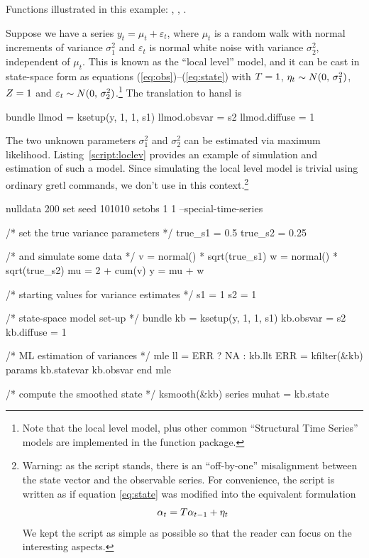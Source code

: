 Functions illustrated in this example: , ,
.

Suppose we have a series $y_t = \mu_t + \varepsilon_t$, where $\mu_t$
is a random walk with normal increments of variance $\sigma^2_1$ and
$\varepsilon_t$ is normal white noise with variance $\sigma^2_2$,
independent of $\mu_t$. This is known as the ``local level'' model,
and it can be cast in state-space form as equations
(\ref{eq:obs})--(\ref{eq:state}) with $T = 1$, $\eta_t \sim
N(0,\, \sigma^2_1)$, $Z = 1$ and $\varepsilon_t \sim N(0,\,
\sigma^2_2)$.\footnote{Note that the local level model, plus other
  common ``Structural Time Series'' models are implemented in the
   function package.} The translation to \textsf{hansl}
is
\begin{code}
bundle llmod = ksetup(y, 1, 1, s1)
llmod.obsvar = s2
llmod.diffuse = 1
\end{code}

The two unknown parameters $\sigma^2_1$ and $\sigma^2_2$ can be
estimated via maximum likelihood.  Listing~\ref{script:loclev} provides
an example of simulation and estimation of such a model. Since
simulating the local level model is trivial using ordinary gretl
commands, we don't use  in this context.\footnote{Warning:
  as the script stands, there is an ``off-by-one'' misalignment
  between the state vector and the observable series. For convenience,
  the script is written as if equation \eqref{eq:state} was modified
  into the equivalent formulation
  \[
  \alpha_{t} = T \alpha_{t-1} + \eta_t
  \]
  We kept the script as simple as possible so that the reader can
  focus on the interesting aspects.}

\begin{script}[htbp]
  \label{script:loclev}
\begin{scode}
nulldata 200
set seed 101010
setobs 1 1 --special-time-series

/* set the true variance parameters */
true_s1 = 0.5
true_s2 = 0.25

/* and simulate some data */
v = normal() * sqrt(true_s1)
w = normal() * sqrt(true_s2)
mu = 2 + cum(v)
y = mu + w

/* starting values for variance estimates */
s1 = 1
s2 = 1

/* state-space model set-up */
bundle kb = ksetup(y, 1, 1, s1)
kb.obsvar = s2
kb.diffuse = 1

/* ML estimation of variances */
mle ll = ERR ? NA : kb.llt
    ERR = kfilter(&kb)
    params kb.statevar kb.obsvar
end mle

/* compute the smoothed state */
ksmooth(&kb)
series muhat = kb.state
\end{scode}
\end{script}

